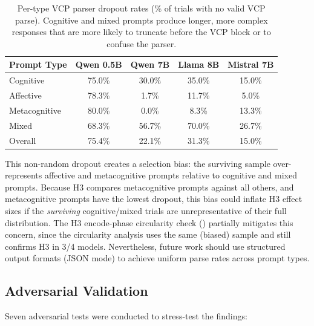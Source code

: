 \documentclass[11pt,a4paper]{article}
\begin{document}
\begin{table}[H]
\centering
\caption{Per-type VCP parser dropout rates (\% of trials with no valid VCP parse). Cognitive and mixed prompts produce longer, more complex responses that are more likely to truncate before the VCP block or to confuse the parser.}
\label{tab:dropout}
\begin{tabular}{lcccc}
\toprule
\textbf{Prompt Type} & \textbf{Qwen 0.5B} & \textbf{Qwen 7B} & \textbf{Llama 8B} & \textbf{Mistral 7B} \\
\midrule
Cognitive       & 75.0\% & 30.0\% & 35.0\% & 15.0\% \\
Affective       & 78.3\% &  1.7\% & 11.7\% &  5.0\% \\
Metacognitive   & 80.0\% &  0.0\% &  8.3\% & 13.3\% \\
Mixed           & 68.3\% & 56.7\% & 70.0\% & 26.7\% \\
\midrule
Overall         & 75.4\% & 22.1\% & 31.3\% & 15.0\% \\
\bottomrule
\end{tabular}
\end{table}

This non-random dropout creates a selection bias: the surviving sample over-represents affective and metacognitive prompts relative to cognitive and mixed prompts. Because H3 compares metacognitive prompts against all others, and metacognitive prompts have the lowest dropout, this bias could inflate H3 effect sizes if the \emph{surviving} cognitive/mixed trials are unrepresentative of their full distribution. The H3 encode-phase circularity check () partially mitigates this concern, since the circularity analysis uses the same (biased) sample and still confirms H3 in 3/4 models. Nevertheless, future work should use structured output formats (JSON mode) to achieve uniform parse rates across prompt types.

\subsection{Adversarial Validation}

Seven adversarial tests were conducted to stress-test the findings:
\end{document}
